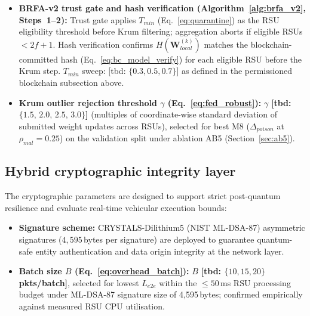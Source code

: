 \documentclass[12pt, a4paper]{report}
\begin{document}
{{\begin{itemize}
        $z = 2.326$ ($z_{0.99}$, one-tailed Gaussian approximation~\cite{casella2002statistical}), targeting $\leq 1\%$ FPR per RSU; validated on the validation split for $\geq 95\%$ precision jointly with $\leq 1\%$ FPR. Sensitivity to the Gaussian approximation evaluated by comparing empirical FPR against the 1\% target on the held-out test set.
    \item \textbf{BRFA-v2 trust gate and hash verification         (Algorithm~\ref{alg:brfa_v2}, Steps~1--2):} Trust gate applies $T_{min}$
            (Eq.~\ref{eq:quarantine}) as the RSU eligibility threshold before Krum filtering; aggregation aborts if eligible RSUs $< 2f{+}1$. Hash verification confirms $H(\mathbf{W}_{local}^{(k)})$ matches the blockchain-committed hash
            (Eq.~\ref{eq:bc_model_verify}) for each eligible RSU before the Krum step.
            $T_{min}$ sweep: [tbd: $\{0.3, 0.5, 0.7\}$] as defined in the permissioned blockchain subsection above.
    \item \textbf{Krum outlier rejection threshold $\gamma$ (Eq.~\ref{eq:fed_robust}):}
        $\gamma$ \textbf{[tbd: $\{1.5,\, 2.0,\, 2.5,\,3.0\}$]} (multiples of coordinate-wise standard deviation of submitted weight updates across RSUs), selected
        for best M8 ($\Delta_{poison}$ at $\rho_{mal} = 0.25$) on the validation split under ablation AB5 (Section~\ref{sec:ab5}).


\end{itemize}

\subsection{Hybrid cryptographic integrity layer}
The cryptographic parameters are designed to support strict post-quantum resilience and evaluate real-time vehicular execution bounds:

\begin{itemize}
    \item \textbf{Signature scheme:} CRYSTALS-Dilithium5 (NIST ML-DSA-87) asymmetric signatures ($4,595$\,bytes per signature) are deployed to guarantee quantum-safe entity authentication and data origin integrity at the network layer.
    
    \item \textbf{Batch size $B$
    (Eq.~\ref{eq:overhead_batch}):}
    $B$ \textbf{[tbd: $\{10, 15, 20\}$\,pkts/batch]},
    selected for lowest $L_{e2e}$ within the
    $\leq 50$\,ms RSU processing budget under
    ML-DSA-87 signature size of 4{,}595\,bytes;
    confirmed empirically against measured RSU
    CPU utilisation.
   


\end{itemize}}}
\end{document}
